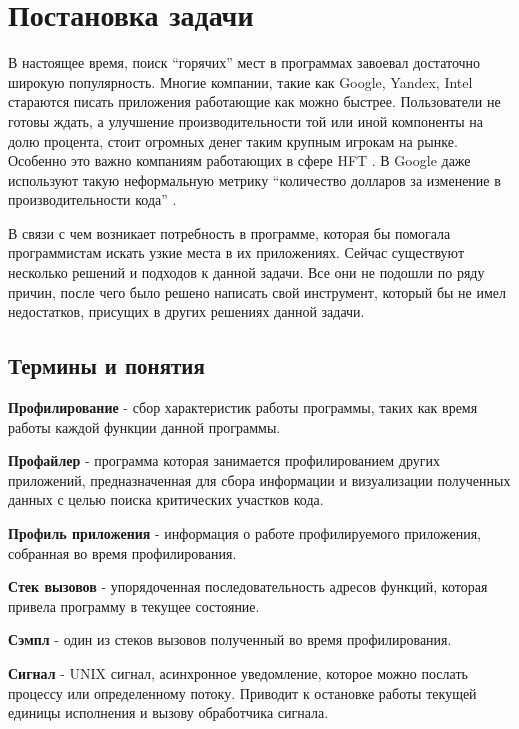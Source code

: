 
\chapter{Постановка задачи}

	В настоящее время, поиск \enquote{горячих} мест в программах завоевал достаточно широкую популярность. Многие компании, такие как Google, Yandex, Intel стараются писать приложения работающие как можно быстрее. Пользователи не готовы ждать, а улучшение производительности той или иной компоненты на долю процента, стоит огромных денег таким крупным игрокам на рынке. Особенно это важно компаниям работающих в сфере HFT \cite{hft}. В Google даже используют такую неформальную метрику \enquote{количество долларов за изменение в производительности кода} \cite{gwp}.

	В связи с чем возникает потребность в программе, которая бы помогала программистам искать узкие места в их приложениях. Сейчас существуют несколько решений и подходов к данной задачи. Все они не подошли по ряду причин, после чего было решено написать свой инструмент, который бы не имел недостатков, присущих в других решениях данной задачи.

\section{Термины и понятия}

	\textbf{Профилирование} - сбор характеристик работы программы, таких как время работы каждой функции данной программы. 
    
    \textbf{Профайлер} - программа которая занимается профилированием других приложений, предназначенная для сбора информации и визуализации полученных данных с целью поиска критических участков кода.
    
    \textbf{Профиль приложения} - информация о работе профилируемого приложения, собранная во время профилирования.
    
    \textbf{Стек вызовов} - упорядоченная последовательность адресов функций, которая привела программу в текущее состояние.
    
    \textbf{Сэмпл} - один из стеков вызовов полученный во время профилирования.
    
    \textbf{Сигнал} - UNIX сигнал, асинхронное уведомление, которое можно послать процессу или определенному потоку. Приводит к остановке работы текущей единицы исполнения и вызову обработчика сигнала.  
    
